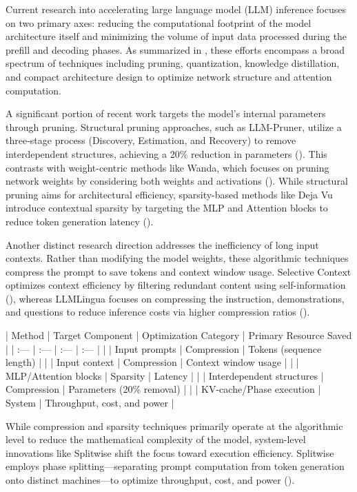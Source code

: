 \documentclass[11pt]{article}
\begin{document}
Current research into accelerating large language model (LLM) inference focuses on two primary axes: reducing the computational footprint of the model architecture itself and minimizing the volume of input data processed during the prefill and decoding phases. As summarized in \citep{2402.09748}, these efforts encompass a broad spectrum of techniques including pruning, quantization, knowledge distillation, and compact architecture design to optimize network structure and attention computation.

A significant portion of recent work targets the model's internal parameters through pruning. Structural pruning approaches, such as LLM-Pruner, utilize a three-stage process (Discovery, Estimation, and Recovery) to remove interdependent structures, achieving a 20\% reduction in parameters (\citep{2305.11627}). This contrasts with weight-centric methods like Wanda, which focuses on pruning network weights by considering both weights and activations (\citep{2306.11695}). While structural pruning aims for architectural efficiency, sparsity-based methods like Deja Vu introduce contextual sparsity by targeting the MLP and Attention blocks to reduce token generation latency (\citep{2310.17157}).

Another distinct research direction addresses the inefficiency of long input contexts. Rather than modifying the model weights, these algorithmic techniques compress the prompt to save tokens and context window usage. Selective Context optimizes context efficiency by filtering redundant content using self-information (\citep{2310.06201}), whereas LLMLingua focuses on compressing the instruction, demonstrations, and questions to reduce inference costs via higher compression ratios (\citep{2310.05736}).

| Method | Target Component | Optimization Category | Primary Resource Saved |
| :--- | :--- | :--- | :--- |
| \citep{2310.05736} | Input prompts | Compression | Tokens (sequence length) |
| \citep{2310.06201} | Input context | Compression | Context window usage |
| \citep{2310.17157} | MLP/Attention blocks | Sparsity | Latency |
| \citep{2305.11627} | Interdependent structures | Compression | Parameters (20\% removal) |
| \citep{2311.18677} | KV-cache/Phase execution | System | Throughput, cost, and power |

While compression and sparsity techniques primarily operate at the algorithmic level to reduce the mathematical complexity of the model, system-level innovations like Splitwise shift the focus toward execution efficiency. Splitwise employs phase splitting—separating prompt computation from token generation onto distinct machines—to optimize throughput, cost, and power (\citep{2311.18677}).
\end{document}
